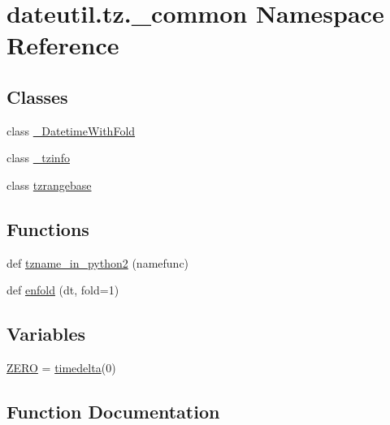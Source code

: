 \hypertarget{namespacedateutil_1_1tz_1_1__common}{}\section{dateutil.\+tz.\+\_\+common Namespace Reference}
\label{namespacedateutil_1_1tz_1_1__common}
\subsection*{Classes}
\begin{DoxyCompactItemize}
\item 
class \hyperlink{classdateutil_1_1tz_1_1__common_1_1__DatetimeWithFold}{\+\_\+\+Datetime\+With\+Fold}
\item 
class \hyperlink{classdateutil_1_1tz_1_1__common_1_1__tzinfo}{\+\_\+tzinfo}
\item 
class \hyperlink{classdateutil_1_1tz_1_1__common_1_1tzrangebase}{tzrangebase}
\end{DoxyCompactItemize}
\subsection*{Functions}
\begin{DoxyCompactItemize}
\item 
def \hyperlink{namespacedateutil_1_1tz_1_1__common_a589776d93a5a80470ff37521c784d7f3}{tzname\+\_\+in\+\_\+python2} (namefunc)
\item 
def \hyperlink{namespacedateutil_1_1tz_1_1__common_a69beb3070686450aea078d6537f86956}{enfold} (dt, fold=1)
\end{DoxyCompactItemize}
\subsection*{Variables}
\begin{DoxyCompactItemize}
\item 
\hyperlink{namespacedateutil_1_1tz_1_1__common_a63ae4d0250c5dc4580b5b5b4da72781b}{Z\+E\+RO} = \hyperlink{noprefix_8h_ae6feacec25f59b525f6e0c442ef75ff7}{timedelta}(0)
\end{DoxyCompactItemize}


\subsection{Function Documentation}
\mbox{\label{namespacedateutil_1_1tz_1_1__common_a69beb3070686450aea078d6537f86956}} 
